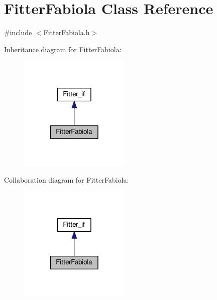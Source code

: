 \hypertarget{class_fitter_fabiola}{\section{Fitter\-Fabiola Class Reference}
\label{class_fitter_fabiola}
}


{\ttfamily \#include $<$Fitter\-Fabiola.\-h$>$}



Inheritance diagram for Fitter\-Fabiola\-:
\nopagebreak
\begin{figure}[H]
\begin{center}
\leavevmode
\includegraphics[width=150pt]{class_fitter_fabiola__inherit__graph}
\end{center}
\end{figure}


Collaboration diagram for Fitter\-Fabiola\-:
\nopagebreak
\begin{figure}[H]
\begin{center}
\leavevmode
\includegraphics[width=150pt]{class_fitter_fabiola__coll__graph}
\end{center}
\end{figure}
